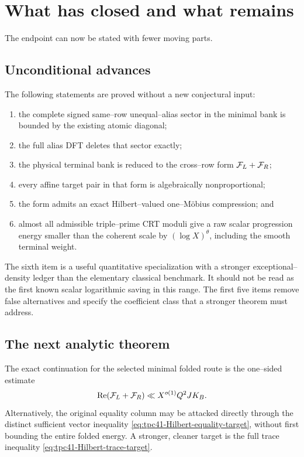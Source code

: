 \section{What has closed and what remains}
\label{sec:tpc41-next-gate}

The endpoint can now be stated with fewer moving parts.

\subsection{Unconditional advances}

The following statements are proved without a new conjectural input:
\begin{enumerate}[label=(\roman*)]
 \item the complete signed same--row unequal--alias sector in the minimal
 bank is bounded by the existing atomic diagonal;
 \item the full alias DFT deletes that sector exactly;
 \item the physical terminal bank is reduced to the cross--row form
 \(\mathcal F_L+\mathcal F_R\);
 \item every affine target pair in that form is algebraically
 nonproportional;
 \item the form admits an exact Hilbert--valued one--M\"obius
 compression; and
 \item almost all admissible triple--prime CRT moduli give a raw scalar
 progression energy smaller than the coherent scale by
 \((\log X)^\theta\), including the smooth terminal weight.
\end{enumerate}

The sixth item is a useful quantitative specialization with a stronger
exceptional--density ledger than the elementary classical benchmark.  It
should not be read as the first known scalar logarithmic saving in this
range.  The first five items remove false alternatives and specify the
coefficient class that a stronger theorem must address.

\subsection{The next analytic theorem}

The exact continuation for the selected minimal folded route is the
one--sided estimate
\begin{equation}
 \operatorname{Re}(\mathcal F_L+\mathcal F_R)
 \ll X^{o(1)}Q^2JK_B.
 \label{eq:tpc41-next-weakest}
\end{equation}
Alternatively, the original equality column may be attacked directly
through the distinct sufficient vector inequality
\eqref{eq:tpc41-Hilbert-equality-target}, without first bounding the
entire folded energy.  A stronger, cleaner target is the full trace inequality
\eqref{eq:tpc41-Hilbert-trace-target}.

